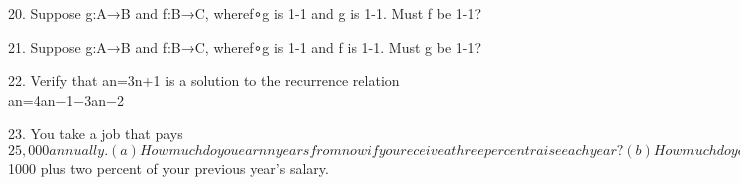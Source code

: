 \documentclass{article}
\begin{document}
20. Suppose g:A→B and f:B→C, wheref∘g is 1-1 and g is 1-1. Must f be 1-1?

21. Suppose g:A→B and f:B→C, wheref∘g is 1-1 and f is 1-1. Must g be 1-1?

22. Verify that an=3n+1 is a solution to the recurrence relation an=4an−1−3an−2

23. You take a job that pays $25,000 annually. 

(a) How much do you earn n years from now if you receive a three percent raise each year? 

(b) How much do you earn n years from now if you receive a five percent raise each year? 

(c) How much do you earn n years from now if each year you receive a raise of $1000 plus two percent of your previous year’s salary.
\end{document}
